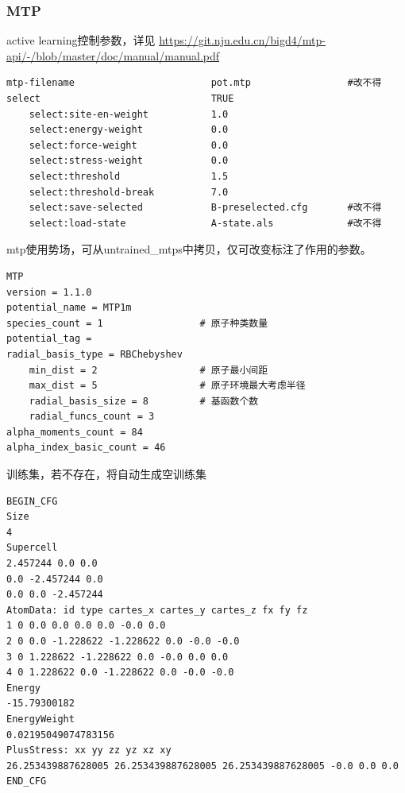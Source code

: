 \documentclass[12pt]{article}
\begin{document}
\subsubsection{MTP}
\begin{tcolorbox}[enhanced, breakable, title = {mlip.ini}]
active learning控制参数，详见
\textcolor{blue}{\url{https://git.nju.edu.cn/bigd4/mtp-api/-/blob/master/doc/manual/manual.pdf}}
\tcblower
\begin{verbatim} 
mtp-filename                        pot.mtp                 #改不得                                                                 
select                              TRUE                  
    select:site-en-weight           1.0     
    select:energy-weight            0.0   
    select:force-weight             0.0  
    select:stress-weight            0.0 
    select:threshold                1.5 
    select:threshold-break          7.0 
    select:save-selected            B-preselected.cfg       #改不得
    select:load-state               A-state.als             #改不得
\end{verbatim}
\end{tcolorbox}
\begin{tcolorbox}[enhanced, breakable, title = {pot.mtp}]
mtp使用势场，可从untrained\_mtps中拷贝，仅可改变标注了作用的参数。
\tcblower
\begin{verbatim} 
MTP                                                                                                           
version = 1.1.0
potential_name = MTP1m
species_count = 1                 # 原子种类数量
potential_tag = 
radial_basis_type = RBChebyshev
    min_dist = 2                  # 原子最小间距
    max_dist = 5                  # 原子环境最大考虑半径
    radial_basis_size = 8         # 基函数个数
    radial_funcs_count = 3 
alpha_moments_count = 84
alpha_index_basic_count = 46     
\end{verbatim}
\end{tcolorbox}
\begin{tcolorbox}[enhanced, breakable, title = {train.cfg}]
训练集，若不存在，将自动生成空训练集
\tcblower
\begin{verbatim} 
BEGIN_CFG                                                                                                     
Size
4
Supercell
2.457244 0.0 0.0
0.0 -2.457244 0.0
0.0 0.0 -2.457244
AtomData: id type cartes_x cartes_y cartes_z fx fy fz 
1 0 0.0 0.0 0.0 0.0 -0.0 0.0 
2 0 0.0 -1.228622 -1.228622 0.0 -0.0 -0.0  
3 0 1.228622 -1.228622 0.0 -0.0 0.0 0.0 
4 0 1.228622 0.0 -1.228622 0.0 -0.0 -0.0  
Energy
-15.79300182
EnergyWeight
0.02195049074783156
PlusStress: xx yy zz yz xz xy 
26.253439887628005 26.253439887628005 26.253439887628005 -0.0 0.0 0.0
END_CFG    
\end{verbatim}
\end{tcolorbox}
\end{document}
